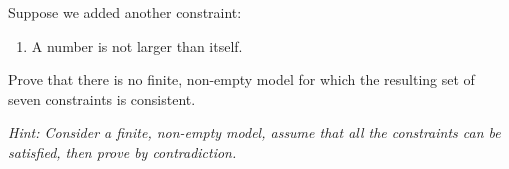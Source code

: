 \item {}
Suppose we added another constraint:
\begin{enumerate}[label=\arabic*., start=7]
  \item A number is not larger than itself.
\end{enumerate}

Prove that there is no finite, non-empty model for which the resulting set of
seven constraints is consistent.

{\em Hint: Consider a finite, non-empty model, assume that all the constraints
can be satisfied, then prove by contradiction.}


\begin{answer}
\end{answer}


